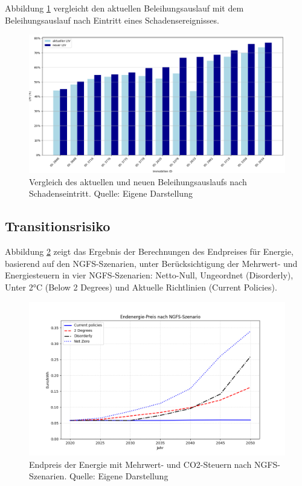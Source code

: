 Abbildung \ref{fig:schadenLtV} vergleicht den aktuellen Beleihungsauslauf mit dem Beleihungsauslauf nach Eintritt eines Schadensereignisses.

\begin{figure}[htbp]
    \centering
    \includegraphics[width=\textwidth]{figures/compareltv.png}
    \caption{Vergleich des aktuellen und neuen Beleihungsauslaufs nach Schadenseintritt. Quelle: Eigene Darstellung}
    \label{fig:schadenLtV}
\end{figure}
\FloatBarrier



\subsection{Transitionsrisiko}
Abbildung \ref{fig:endpreis_energie} zeigt das Ergebnis der Berechnungen des Endpreises für Energie, basierend auf den NGFS-Szenarien, unter Berücksichtigung der Mehrwert- und Energiesteuern in vier NGFS-Szenarien: Netto-Null, Ungeordnet (Disorderly), Unter 2°C (Below 2 Degrees) und Aktuelle Richtlinien (Current Policies).

\begin{figure}[htbp]
    \centering
    \includegraphics[width=\textwidth]{figures/endpreis.png}
    \caption{Endpreis der Energie mit Mehrwert- und CO2-Steuern nach NGFS-Szenarien. Quelle: Eigene Darstellung}
    \label{fig:endpreis_energie}
\end{figure}
\FloatBarrier

